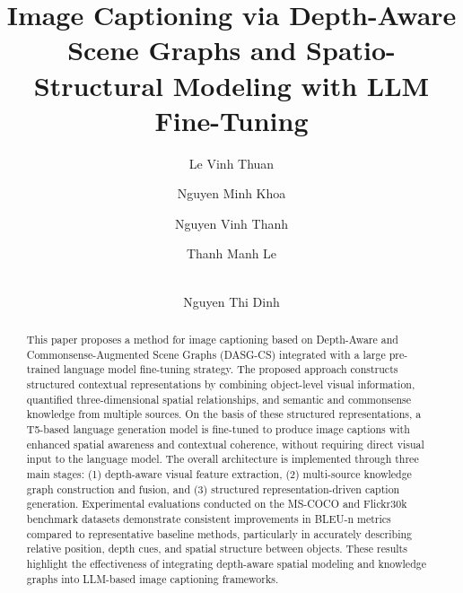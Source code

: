 \documentclass[runningheads,14pt]{llncs}
\begin{document}
%
\title{Image Captioning via Depth-Aware Scene Graphs and Spatio-Structural Modeling with LLM Fine-Tuning}
%
%
\author{Le Vinh Thuan \and Nguyen Minh Khoa \and Nguyen Vinh Thanh \and Thanh Manh Le  \and \\ Nguyen Thi Dinh }



%
\maketitle              %
%
\begin{abstract}
This paper proposes a method for image captioning based on Depth-Aware and Commonsense-Augmented Scene Graphs (DASG-CS) integrated with a large pre-trained 
language model fine-tuning strategy. The proposed approach constructs structured contextual representations by combining object-level visual information, 
quantified three-dimensional spatial relationships, and semantic and commonsense knowledge from multiple sources. On the basis of these structured representations, 
a T5-based language generation model is fine-tuned to produce image captions with enhanced spatial awareness and contextual coherence, without requiring direct visual 
input to the language model. The overall architecture is implemented through three main stages: (1) depth-aware visual feature extraction, (2) multi-source knowledge graph 
construction and fusion, and (3) structured representation-driven caption generation. Experimental evaluations conducted on the MS-COCO and Flickr30k benchmark datasets 
demonstrate consistent improvements in BLEU-n metrics compared to representative baseline methods, particularly in accurately describing relative position, depth cues, 
and spatial structure between objects. These results highlight the effectiveness of integrating depth-aware spatial modeling and knowledge graphs into LLM-based image 
captioning frameworks.

\end{abstract}
%
%
%
\end{document}
